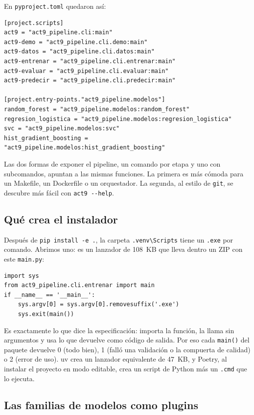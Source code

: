 \documentclass[12pt,a4paper]{article}
\renewcommand{\_}{\guionbajo\allowbreak}
\begin{document}
En \texttt{pyproject.toml} quedaron así:

\begin{verbatim}
[project.scripts]
act9 = "act9_pipeline.cli:main"
act9-demo = "act9_pipeline.cli.demo:main"
act9-datos = "act9_pipeline.cli.datos:main"
act9-entrenar = "act9_pipeline.cli.entrenar:main"
act9-evaluar = "act9_pipeline.cli.evaluar:main"
act9-predecir = "act9_pipeline.cli.predecir:main"

[project.entry-points."act9_pipeline.modelos"]
random_forest = "act9_pipeline.modelos:random_forest"
regresion_logistica = "act9_pipeline.modelos:regresion_logistica"
svc = "act9_pipeline.modelos:svc"
hist_gradient_boosting = "act9_pipeline.modelos:hist_gradient_boosting"
\end{verbatim}

Las dos formas de exponer el pipeline, un comando por etapa y uno con subcomandos, apuntan a las
mismas funciones. La primera es más cómoda para un Makefile, un Dockerfile o un orquestador. La
segunda, al estilo de \texttt{git}, se descubre más fácil con \texttt{act9 -{}-help}.

\subsection{Qué crea el instalador}

Después de \texttt{pip install -e .}, la carpeta \texttt{.venv\textbackslash Scripts} tiene un
\texttt{.exe} por comando. Abrimos uno: es un lanzador de 108~KB que lleva dentro un ZIP con este
\texttt{\_\_main\_\_.py}:

\begin{verbatim}
import sys
from act9_pipeline.cli.entrenar import main
if __name__ == '__main__':
    sys.argv[0] = sys.argv[0].removesuffix('.exe')
    sys.exit(main())
\end{verbatim}

Es exactamente lo que dice la especificación: importa la función, la llama sin argumentos y usa lo
que devuelve como código de salida. Por eso cada \texttt{main()} del paquete devuelve 0 (todo bien),
1 (falló una validación o la compuerta de calidad) o 2 (error de uso). uv crea un lanzador
equivalente de 47~KB, y Poetry, al instalar el proyecto en modo editable, crea un script de Python
más un \texttt{.cmd} que lo ejecuta.

\subsection{Las familias de modelos como plugins}
\end{document}
